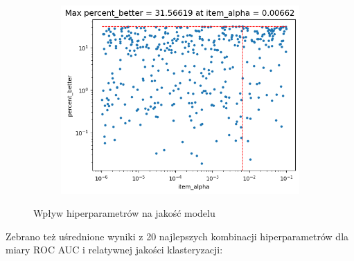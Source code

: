 \documentclass[10pt,a4paper]{article}
\begin{document}
\begin{figure}[H]
\begin{subfigure}{.5\textwidth}
\end{subfigure}%
\begin{subfigure}{.5\textwidth}
    \centering
    \includegraphics[width=1\linewidth]{image_2024-01-19_235352943.png}
\end{subfigure}
\caption[short]{Wpływ hiperparametrów na jakość modelu}
\end{figure}

Zebrano też uśrednione wyniki z 20 najlepszych kombinacji hiperparametrów dla miary ROC AUC i relatywnej jakości klasteryzacji:
\end{document}
